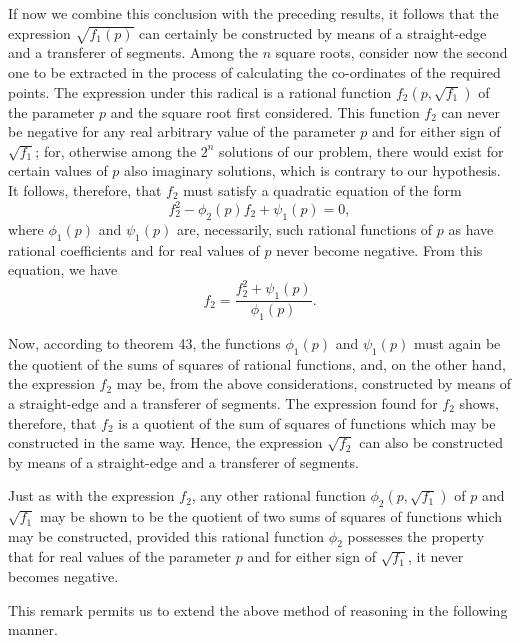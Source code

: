 \documentclass[11pt,oneside]{book}
\begin{document}
If now we combine this conclusion with the preceding
results, it follows that the expression $\sqrt{f_1(p)}$
can certainly be constructed by means of a straight-edge
and a transferer of segments.
Among the $n$ square roots, consider now the second
one to be extracted in the process of calculating
the co-ordinates of the required points. The expression
under this radical is a rational function $f_2(p, \sqrt{f_1})$
of the parameter $p$ and the square root first considered.
This function $f_2$ can never be negative for any real
arbitrary value of the parameter $p$ and for either sign
of $\sqrt{f_1}$; for, otherwise among the $2^n$ solutions of our
problem, there would exist for certain values of $p$ also
imaginary solutions, which is contrary to our hypothesis.
It follows, therefore, that $f_2$ must satisfy a quadratic
equation of the form
\[
 f_2^2 - \phi_2(p)f_2 + \psi_1(p) = 0,
\]
where $\phi_1(p)$ and $\psi_1(p)$ are, necessarily, such rational
functions of $p$ as have rational coefficients and for real
values of $p$ never become negative. From this equation, we have
\[
 f_2 = \frac{f_2^2 + \psi_1(p)}{\phi_1(p)}.
\]

Now, according to theorem 43, the functions $\phi_1(p)$ and
$\psi_1(p)$ must again be the quotient of the sums of squares
of rational functions, and, on the other hand, the expression
$f_2$ may be, from the above considerations,
constructed by means of a straight-edge and a transferer
of segments. The expression found for $f_2$ shows,
therefore, that $f_2$ is a quotient of the sum of squares
of functions which may be constructed in the same
way. Hence, the expression $\sqrt{f_2}$ can also be constructed
by means of a straight-edge and a transferer
of segments.

Just as with the expression $f_2$, any other rational
function $\phi_2(p, \sqrt{f_1})$ of $p$ and $\sqrt{f_1}$ may be shown to be
the quotient of two sums of squares of functions which
may be constructed, provided this rational function
$\phi_2$ possesses the property that for real values of the
parameter $p$ and for either sign of $\sqrt{f_1}$, it never becomes
negative.

This remark permits us to extend the above method
of reasoning in the following manner.
\end{document}
